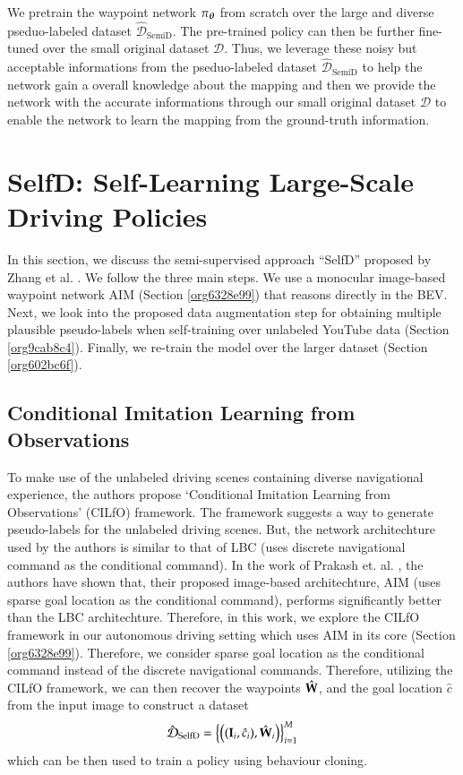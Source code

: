 \documentclass[12pt, letterpaper,cleardoubleempty,BCOR1cm]{scrbook}
\begin{document}
We pretrain the waypoint network \(\pi_{\boldsymbol{\theta}}\) from scratch over the large and
diverse pseduo-labeled dataset \(\hat{\mathcal{D}}_{\text{SemiD}}\). The pre-trained policy
can then be further fine-tuned over the small original dataset \(\mathcal{D}\). Thus, we
leverage these noisy but acceptable informations from the pseduo-labeled dataset
\(\hat{\mathcal{D}}_{\text{SemiD}}\) to help the network gain a overall knowledge about the
mapping and then we provide the network with the accurate informations through
our small original dataset \(\mathcal{D}\) to enable the network to learn the mapping
from the ground-truth information.

\section{SelfD: Self-Learning Large-Scale Driving Policies}
\label{sec:orge69b40f}
In this section, we discuss the semi-supervised approach ``SelfD'' proposed
by Zhang et al. \cite{Zhang2022a}. We follow the three main steps. We use a
monocular image-based waypoint network AIM (Section \ref{org6328e99}) that reasons
directly in the BEV. Next, we look into the proposed data augmentation step
for obtaining multiple plausible pseudo-labels when self-training over
unlabeled YouTube data (Section \ref{org9cab8c4}). Finally, we re-train the model
over the larger dataset (Section \ref{org602bc6f}).

\subsection{Conditional Imitation Learning from Observations}
\label{sec:org5b18c05}
To make use of the unlabeled driving scenes containing diverse navigational
experience, the authors propose `Conditional Imitation Learning from
Observations' (CILfO) \cite{Zhang2022a} framework. The framework suggests a way
to generate pseudo-labels for the unlabeled driving scenes. But, the network
architechture used by the authors is similar to that of LBC \cite{Chen2019}
(uses discrete navigational command as the conditional command). In the work of
Prakash et. al. \cite{Prakash2021}, the authors have shown that, their proposed
image-based architechture, AIM (uses sparse goal location as the conditional
command), performs significantly better than the LBC architechture. Therefore,
in this work, we explore the CILfO framework in our autonomous driving setting
which uses AIM in its core (Section \ref{org6328e99}). Therefore, we consider sparse goal
location as the conditional command instead of the discrete navigational
commands. Therefore, utilizing the CILfO framework, we can then recover the
waypoints \(\hat{\textbf W}\), and the goal location \(\hat{c}\) from the input
image to construct a dataset \[\hat{\mathcal{D}}_{\text{SelfD}}=\left\lbrace \left( (\textbf I_{i}, \hat
c_{i}), \hat{\textbf W}_{i} \right) \right\rbrace_{i=1}^{M}\] which can be then used to train a policy
using behaviour cloning.
\end{document}

